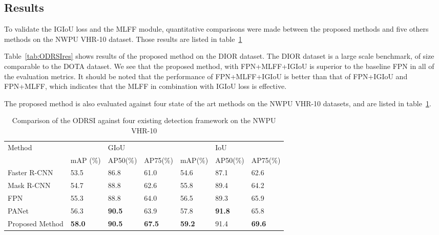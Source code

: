 \subsection{Results}
To validate the IGIoU loss and the MLFF module, quantitative comparisons were made between the proposed methods and five others methods on the NWPU VHR-10 dataset\cite{nwpu}. Those results are listed in table~\ref{tab:ODRSIcomparison}

Table~\ref{tab:ODRSIres} shows results of the proposed method on the DIOR\cite{dior} dataset. The DIOR dataset is a large scale benchmark, of size comparable to the DOTA dataset\cite{dota}. We see that the proposed method, with FPN+MLFF+IGIoU is superior to the baseline FPN in all of the evaluation metrics. It should be noted that the performance of FPN+MLFF+IGIoU is better than that of FPN+IGIoU and FPN+MLFF, which indicates that the MLFF in combination with IGIoU loss is effective.

The proposed method is also evaluated against four state of the art methods on the NWPU VHR-10 datasets, and are listed in table~\ref{tab:ODRSIcomparison}. 

\begin{table}[h!]
	\centering
	\begin{tabular}{@{}lllllll@{}}
		\toprule
		Method       &               & GIoU          &               &               & IoU           &               \\ \cmidrule(l){2-7} 
		             & mAP (\%)      & AP50(\%)      & AP75(\%)      & mAP(\%)       & AP50(\%)      & AP75(\%)      \\ \midrule
			     Faster R-CNN & 53.5          & 86.8          & 61.0          & 54.6          & 87.1          & 62.6          \\
			     Mask R-CNN   & 54.7          & 88.8          & 62.6          & 55.8          & 89.4          & 64.2          \\
			     FPN          & 55.3          & 88.8          & 64.0          & 56.5          & 89.3          & 65.9          \\
			     PANet        & 56.3          & \textbf{90.5} & 63.9          & 57.8          & \textbf{91.8} & 65.8          \\
			     Proposed Method& \textbf{58.0} & \textbf{90.5} & \textbf{67.5} & \textbf{59.2} & 91.4          & \textbf{69.6} \\ \bottomrule
	\end{tabular}
	\caption{Comparison of the ODRSI against four existing detection framework on the NWPU VHR-10}
	\label{tab:ODRSIcomparison}
\end{table}

